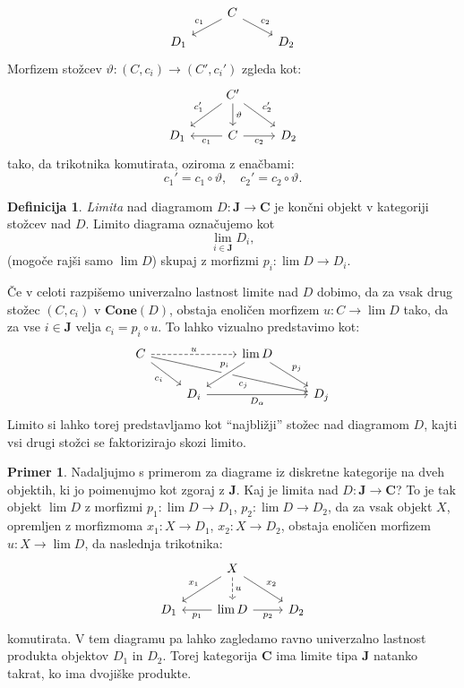 \documentclass[12pt,a4paper]{book}
\theoremstyle{definition}
\newtheorem{definicija}{Definicija}[chapter]
\theoremstyle{plain}
\theoremstyle{definition}
\newtheorem{primer}{Primer}[section]
\theoremstyle{remark}
\newcommand{\cat}[1]{\textbf{#1}}
\begin{document}
%
$$\begin{tikzcd}[column sep=normal, row sep=small]
& C \ar[dl, "c_1"'] \ar[dr, "c_2"] & \\
D_1 && D_2
\end{tikzcd}$$
%
Morfizem stožcev $\vartheta : (C,c_i) \to (C', c_i')$ zgleda kot:
%
$$\begin{tikzcd}
& C' \ar[dl, "c_1'"'] \ar[d, "\vartheta"] \ar[dr, "c_2'"] & \\
D_1 & C \ar[l, "c_1"] \ar[r, "c_2"'] & D_2
\end{tikzcd}$$
%
tako, da trikotnika komutirata, oziroma z enačbami:
$$c_1' = c_1 \circ \vartheta, \quad c_2' = c_2 \circ \vartheta.$$
%
\begin{definicija}
\emph{Limita} nad diagramom $D : \cat{J} \to \cat{C}$ je končni objekt v kategoriji stožcev nad $D$. Limito diagrama označujemo kot
$$\lim_{i \in \cat{J}}D_i,$$
(mogoče rajši samo $\lim D$)
skupaj z morfizmi $p_i : \lim D \to D_i$.
\end{definicija}
%
Če v celoti razpišemo univerzalno lastnost limite nad $D$ dobimo, da za vsak drug stožec $(C,c_i)$ v $\cat{Cone}(D)$, obstaja enoličen morfizem $u : C \to \lim D$ tako, da za vse $i \in \cat{J}$ velja $c_i = p_i \circ u$. To lahko vizualno predstavimo kot:
%
$$\begin{tikzcd}
C \ar[rr, dashed, "u"] \ar[drrr, pos=7/11, "c_j"'] \ar[dr, "c_i"'] & & \lim D \ar[dl, crossing over, pos=1/3, "p_i"'] \ar[dr, "p_j"] \\
& D_i \ar[rr, "D_\alpha"'] & & D_j
\end{tikzcd}$$
%
Limito si lahko torej predstavljamo kot "`najbližji"' stožec nad diagramom $D$, kajti vsi drugi stožci se faktorizirajo skozi limito. 

\begin{primer}
Nadaljujmo s primerom za diagrame iz diskretne kategorije na dveh objektih, ki jo poimenujmo kot zgoraj z $\cat{J}$. Kaj je limita nad $D : \cat{J} \to \cat{C}$? To je tak objekt $\lim D$ z morfizmi $p_1 : \lim D \to D_1$, $p_2 : \lim D \to D_2$, da za vsak objekt $X$, opremljen z morfizmoma $x_1 : X \to D_1$, $x_2 : X \to D_2$, obstaja enoličen morfizem $u : X \to \lim D$, da naslednja trikotnika:
%
$$\begin{tikzcd}
& X \ar[dl, "x_1"'] \ar[d, dashed, "u"] \ar[dr, "x_2"] & \\
D_1 & \lim D \ar[l, "p_1"] \ar[r, "p_2"'] & D_2
\end{tikzcd}$$
komutirata. V tem diagramu pa lahko zagledamo ravno univerzalno lastnost produkta objektov $D_1$ in $D_2$. Torej kategorija $\cat{C}$ ima limite tipa $\cat{J}$ natanko takrat, ko ima dvojiške produkte.

\end{primer}
\end{document}
